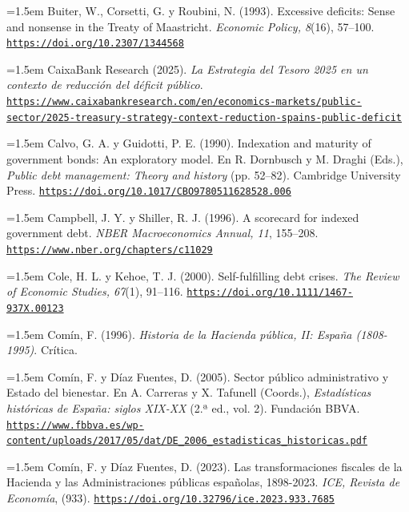 \documentclass[10pt,a4paper]{article}
\begin{document}
\noindent\hangindent=1.5em Buiter, W., Corsetti, G. y Roubini, N. (1993). Excessive deficits: Sense and nonsense in the Treaty of Maastricht. \textit{Economic Policy, 8}(16), 57--100. \href{https://doi.org/10.2307/1344568}{\nolinkurl{https://doi.org/10.2307/1344568}}

\noindent\hangindent=1.5em CaixaBank Research (2025). \textit{La Estrategia del Tesoro 2025 en un contexto de reducción del déficit público}. \href{https://www.caixabankresearch.com/en/economics-markets/public-sector/2025-treasury-strategy-context-reduction-spains-public-deficit}{\nolinkurl{https://www.caixabankresearch.com/en/economics-markets/public-sector/2025-treasury-strategy-context-reduction-spains-public-deficit}}

\noindent\hangindent=1.5em Calvo, G. A. y Guidotti, P. E. (1990). Indexation and maturity of government bonds: An exploratory model. En R. Dornbusch y M. Draghi (Eds.), \textit{Public debt management: Theory and history} (pp. 52--82). Cambridge University Press. \href{https://doi.org/10.1017/CBO9780511628528.006}{\nolinkurl{https://doi.org/10.1017/CBO9780511628528.006}}

\noindent\hangindent=1.5em Campbell, J. Y. y Shiller, R. J. (1996). A scorecard for indexed government debt. \textit{NBER Macroeconomics Annual, 11}, 155--208. \href{https://www.nber.org/chapters/c11029}{\nolinkurl{https://www.nber.org/chapters/c11029}}

\noindent\hangindent=1.5em Cole, H. L. y Kehoe, T. J. (2000). Self-fulfilling debt crises. \textit{The Review of Economic Studies, 67}(1), 91--116. \href{https://doi.org/10.1111/1467-937X.00123}{\nolinkurl{https://doi.org/10.1111/1467-937X.00123}}

\noindent\hangindent=1.5em Comín, F. (1996). \textit{Historia de la Hacienda pública, II: España (1808-1995)}. Crítica.

\noindent\hangindent=1.5em Comín, F. y Díaz Fuentes, D. (2005). Sector público administrativo y Estado del bienestar. En A. Carreras y X. Tafunell (Coords.), \textit{Estadísticas históricas de España: siglos XIX-XX} (2.ª ed., vol. 2). Fundación BBVA. \href{https://www.fbbva.es/wp-content/uploads/2017/05/dat/DE_2006_estadisticas_historicas.pdf}{\nolinkurl{https://www.fbbva.es/wp-content/uploads/2017/05/dat/DE_2006_estadisticas_historicas.pdf}}

\noindent\hangindent=1.5em Comín, F. y Díaz Fuentes, D. (2023). Las transformaciones fiscales de la Hacienda y las Administraciones públicas españolas, 1898-2023. \textit{ICE, Revista de Economía}, (933). \href{https://doi.org/10.32796/ice.2023.933.7685}{\nolinkurl{https://doi.org/10.32796/ice.2023.933.7685}}
\end{document}
